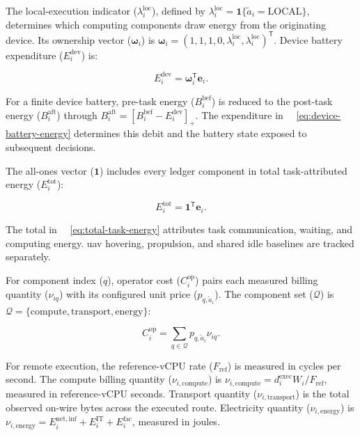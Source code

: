 \documentclass[journal]{IEEEtran}
\providecommand*{\algorithmautorefname}{Algorithm}
\providecommand*{\figureautorefname}{Figure}
\providecommand*{\subfigureautorefname}{Figure}
\providecommand*{\Autoref}[1]{%
  \begingroup
  \def\sectionautorefname{Section}%
  \def\subsectionautorefname{Subsection}%
  \def\subsubsectionautorefname{Subsubsection}%
  \def\algorithmautorefname{Algorithm}%
  \def\figureautorefname{Figure}%
  \def\subfigureautorefname{Figure}%
 ~\autoref{#1}%
  \endgroup
}
\newcommand{\Autoref}[1]{Eq.~\Autoref{#1}}
\begin{document}
The local-execution indicator (\(\lambda_i^{\mathrm{loc}}\)), defined by \(\lambda_i^{\mathrm{loc}}=\mathbf1\{\tilde a_i=\mathrm{LOCAL}\}\), determines which computing components draw energy from the originating device. Its ownership vector (\(\boldsymbol\omega_i\)) is \(\boldsymbol\omega_i=(1,1,1,0,\lambda_i^{\mathrm{loc}},\lambda_i^{\mathrm{loc}})^{\mathsf T}\). Device battery expenditure (\(E_i^{\mathrm{dev}}\)) is:

\begin{equation}
\label{eq:device-battery-energy}
E_i^{\mathrm{dev}}
=
\boldsymbol\omega_i^{\mathsf T}\mathbf e_i.
\end{equation}

For a finite device battery, pre-task energy (\(B_i^{\mathrm{bef}}\)) is reduced to the post-task energy (\(B_i^{\mathrm{aft}}\)) through \(B_i^{\mathrm{aft}}=[B_i^{\mathrm{bef}}-E_i^{\mathrm{dev}}]_+\). The expenditure in~\Autoref{eq:device-battery-energy} determines this debit and the battery state exposed to subsequent decisions.

The all-ones vector (\(\mathbf1\)) includes every ledger component in total task-attributed energy (\(E_i^{\mathrm{tot}}\)):

\begin{equation}
\label{eq:total-task-energy}
E_i^{\mathrm{tot}}
=
\mathbf1^{\mathsf T}\mathbf e_i.
\end{equation}

The total in~\Autoref{eq:total-task-energy} attributes task communication, waiting, and computing energy. \acs{uav} hovering, propulsion, and shared idle baselines are tracked separately.

For component index (\(q\)), operator cost (\(C_i^{\mathrm{op}}\)) pairs each measured billing quantity (\(\nu_{iq}\)) with its configured unit price (\(p_{q,\tilde a_i}\)). The component set (\(\mathcal Q\)) is \(\mathcal Q=\{\mathrm{compute},\mathrm{transport},\mathrm{energy}\}\):

\begin{equation}
\label{eq:operator-cost}
C_i^{\mathrm{op}}
=
\sum_{q\in\mathcal Q}
p_{q,\tilde a_i}\nu_{iq}.
\end{equation}

For remote execution, the reference-vCPU rate (\(F_{\mathrm{ref}}\)) is measured in cycles per second. The compute billing quantity (\(\nu_{i,\mathrm{compute}}\)) is \(\nu_{i,\mathrm{compute}}=d_i^{\mathrm{exec}}W_i/F_{\mathrm{ref}}\), measured in reference-vCPU seconds. Transport quantity (\(\nu_{i,\mathrm{transport}}\)) is the total observed on-wire bytes across the executed route. Electricity quantity (\(\nu_{i,\mathrm{energy}}\)) is \(\nu_{i,\mathrm{energy}}=E_i^{\mathrm{net,inf}}+E_i^{\mathrm{IT}}+E_i^{\mathrm{fac}}\), measured in joules. 
\end{document}
